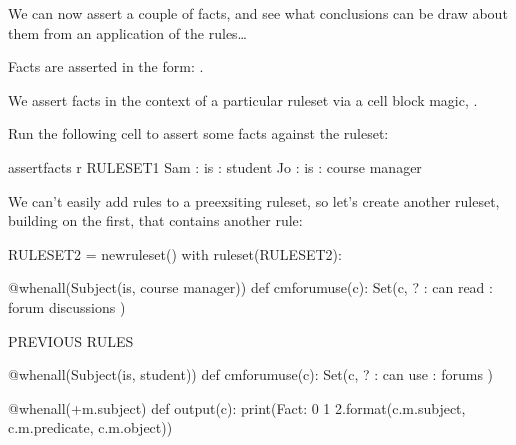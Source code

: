 \documentclass[letterpaper,10pt,english]{sphinxmanual}
\begin{document}
We can now assert a couple of facts, and see what conclusions can be draw about them from an application of the rules…

Facts are asserted in the form: .

We assert facts in the context of a particular ruleset via a cell block magic, .

Run the following cell to assert some facts against the  ruleset:

{
\begin{sphinxVerbatim}[commandchars=\\\{\}]
\llap{\color{nbsphinxin}[ ]:\,\hspace{\fboxrule}\hspace{\fboxsep}}\PYGZpc{}\PYGZpc{}assert\PYGZus{}facts \PYGZhy{}r RULESET\PYGZus{}1
Sam : is : student
Jo : is : course manager
\end{sphinxVerbatim}
}

We can’t easily add rules to a pre\sphinxhyphen{}exsiting ruleset, so let’s create another ruleset, building on the first, that contains another rule:

{
\begin{sphinxVerbatim}[commandchars=\\\{\}]
\llap{\color{nbsphinxin}[ ]:\,\hspace{\fboxrule}\hspace{\fboxsep}}RULESET\PYGZus{}2 = new\PYGZus{}ruleset()
with ruleset(RULESET\PYGZus{}2):

    @when\PYGZus{}all(Subject(\PYGZdq{}is\PYGZdq{}, \PYGZdq{}course manager\PYGZdq{}))
    def cm\PYGZus{}forum\PYGZus{}use(c):
        Set(c, \PYGZsq{}? : can read : forum discussions\PYGZsq{} )


    \PYGZsh{} \PYGZhy{}\PYGZhy{} PREVIOUS RULES \PYGZhy{}\PYGZhy{}

    @when\PYGZus{}all(Subject(\PYGZdq{}is\PYGZdq{}, \PYGZdq{}student\PYGZdq{}))
    def cm\PYGZus{}forum\PYGZus{}use(c):
        Set(c, \PYGZsq{}? : can use : forums\PYGZsq{} )

    @when\PYGZus{}all(+m.subject)
    def output(c):
        print(\PYGZsq{}Fact: \PYGZob{}0\PYGZcb{} \PYGZob{}1\PYGZcb{} \PYGZob{}2\PYGZcb{}\PYGZsq{}.format(c.m.subject, c.m.predicate, c.m.object))
\end{sphinxVerbatim}
}
\end{document}
